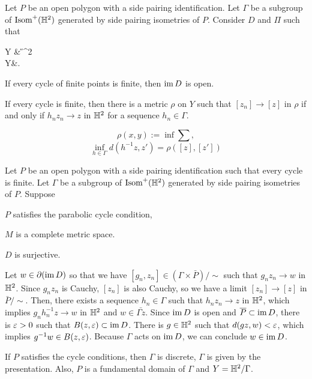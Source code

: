 \documentclass[a4paper]{article}
\begin{document}
\begin{prb}
Let $P$ be an open polygon with a side pairing identification.
Let $\Gamma$ be a subgroup of $\operatorname{Isom}^+(\mathbb{H}^2)$ generated by side pairing isometries of $P$.
Consider $D$ and $\Pi$ such that
\begin{cd}
\tilde Y\dar{\Pi} & \H^2\\
Y&.
\end{cd}
\begin{parts}
\item If every cycle of finite points is finite, then $\operatorname{im} D$ is open.
\item If every cycle is finite, then there is a metric $\rho$ on $Y$ such that $[z_n]\to[z]$ in $\rho$ if and only if $h_nz_n\to z$ in $\mathbb{H}^2$ for a sequence $h_n\in\Gamma$.
\end{parts}
\end{prb}
\begin{pf}
\[\rho(x,y):=\inf\sum,\]
\[\inf_{h\in\Gamma}d(h^{-1}z,z')=\rho([z],[z'])\]
\end{pf}

\begin{prb}
Let $P$ be an open polygon with a side pairing identification such that every cycle is finite.
Let $\Gamma$ be a subgroup of $\operatorname{Isom}^+(\mathbb{H}^2)$ generated by side pairing isometries of $P$.
Suppose 
\begin{parts}
\item $P$ satisfies the parabolic cycle condition,
\item $M$ is a complete metric space.
\item $D$ is surjective.
\end{parts}
\end{prb}
\begin{pf}
Let $w\in\partial(\operatorname{im} D)$ so that we have $[g_n,z_n]\in(\Gamma\times\bar P)/\sim$ such that $g_nz_n\to w$ in $\mathbb{H}^2$.
Since $g_nz_n$ is Cauchy, $[z_n]$ is also Cauchy, so we have a limit $[z_n]\to[z]$ in $\bar P/\sim$.
Then, there exists a sequence $h_n\in\Gamma$ such that $h_nz_n\to z$ in $\mathbb{H}^2$, which implies $g_nh_n^{-1}z\to w$ in $\mathbb{H}^2$ and $w\in\bar{\Gamma z}$.
Since $\operatorname{im} D$ is open and $\overline P\subset\operatorname{im} D$, there is $\varepsilon>0$ such that $B(z,\varepsilon)\subset\operatorname{im} D$.
There is $g\in\mathbb{H}^2$ such that $d(gz,w)<\varepsilon$, which implies $g^{-1}w\in B(z,\varepsilon)$.
Because $\Gamma$ acts on $\operatorname{im} D$, we can conclude $w\in\operatorname{im} D$.
\end{pf}

If $P$ satisfies the cycle conditions, then $\Gamma$ is discrete, $\Gamma$ is given by the presentation.
Also, $P$ is a fundamental domain of $\Gamma$ and $Y=\mathbb{H}^2/\Gamma$.
\end{document}
